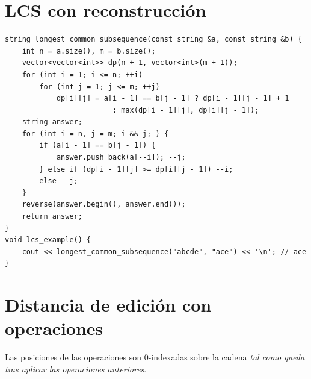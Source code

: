 \section{LCS con reconstrucci\'on}

\begin{lstlisting}[style=cpp]
string longest_common_subsequence(const string &a, const string &b) {
    int n = a.size(), m = b.size();
    vector<vector<int>> dp(n + 1, vector<int>(m + 1));
    for (int i = 1; i <= n; ++i)
        for (int j = 1; j <= m; ++j)
            dp[i][j] = a[i - 1] == b[j - 1] ? dp[i - 1][j - 1] + 1
                         : max(dp[i - 1][j], dp[i][j - 1]);
    string answer;
    for (int i = n, j = m; i && j; ) {
        if (a[i - 1] == b[j - 1]) {
            answer.push_back(a[--i]); --j;
        } else if (dp[i - 1][j] >= dp[i][j - 1]) --i;
        else --j;
    }
    reverse(answer.begin(), answer.end());
    return answer;
}
void lcs_example() {
    cout << longest_common_subsequence("abcde", "ace") << '\n'; // ace
}
\end{lstlisting}


\section{Distancia de edici\'on con operaciones}

Las posiciones de las operaciones son 0-indexadas sobre la cadena
\emph{tal como queda tras aplicar las operaciones anteriores}.

